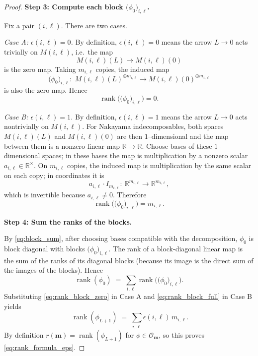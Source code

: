 \documentclass{article}
\newcommand{\rank}{\operatorname{rank}}
\theoremstyle{definition}
\begin{document}
\begin{proof}
\medskip\noindent
\textbf{Step 3: Compute each block $\big(\phi_{0}\big)_{i,\ell}$.}

Fix a pair $(i,\ell)$. There are two cases.

\smallskip\noindent
\emph{Case A: $\epsilon(i,\ell)=0$.}
By definition, $\epsilon(i,\ell)=0$ means the arrow $L\to 0$ acts trivially on $M(i,\ell)$, i.e.\ the map
\[
M(i,\ell)(L)\to M(i,\ell)(0)
\]
is the zero map. Taking $m_{i,\ell}$ copies, the induced map
\[
\big(\phi_{0}\big)_{i,\ell}:\;
M(i,\ell)(L)^{\oplus m_{i,\ell}}
\to
M(i,\ell)(0)^{\oplus m_{i,\ell}}
\]
is also the zero map. Hence
\begin{equation}
\label{eq:rank_block_zero}
\rank\big(\big(\phi_{0}\big)_{i,\ell}\big)=0.
\end{equation}

\smallskip\noindent
\emph{Case B: $\epsilon(i,\ell)=1$.}
By definition, $\epsilon(i,\ell)=1$ means the arrow $L\to 0$ acts nontrivially on $M(i,\ell)$.
For Nakayama indecomposables, both spaces $M(i,\ell)(L)$ and $M(i,\ell)(0)$ are then $1$--dimensional and
the map between them is a nonzero linear map $\mathbb{R}\to \mathbb{R}$.
Choose bases of these $1$--dimensional spaces; in these bases the map is multiplication by a nonzero scalar
$a_{i,\ell}\in \mathbb{R}^\times$.
On $m_{i,\ell}$ copies, the induced map is multiplication by the same scalar on each copy; in coordinates it is
\[
a_{i,\ell}\cdot I_{m_{i,\ell}}:\ \mathbb{R}^{m_{i,\ell}}\to \mathbb{R}^{m_{i,\ell}},
\]
which is invertible because $a_{i,\ell}\neq 0$. Therefore
\begin{equation}
\label{eq:rank_block_full}
\rank\big(\big(\phi_{0}\big)_{i,\ell}\big)=m_{i,\ell}.
\end{equation}

\medskip\noindent
\textbf{Step 4: Sum the ranks of the blocks.}

By \eqref{eq:block_sum}, after choosing bases compatible with the decomposition,
$\phi_{0}$ is block diagonal with blocks $\big(\phi_{0}\big)_{i,\ell}$.
The rank of a block-diagonal linear map is the sum of the ranks of its diagonal blocks
(because its image is the direct sum of the images of the blocks).
Hence
\[
\rank(\phi_{0})
\;=\;
\sum_{i,\ell}\rank\big(\big(\phi_{0}\big)_{i,\ell}\big).
\]
Substituting \eqref{eq:rank_block_zero} in Case A and \eqref{eq:rank_block_full} in Case B yields
\[\
\rank(\phi_{L+1})
\;=\;
\sum_{i,\ell}\epsilon(i,\ell)\,m_{i,\ell}.
\]
By definition $r(\mathbf m)=\rank(\phi_{L+1})$ for $\phi\in\mathcal O_{\mathbf m}$, so this proves
\eqref{eq:rank_formula_eps}. 
\end{proof}
\end{document}
